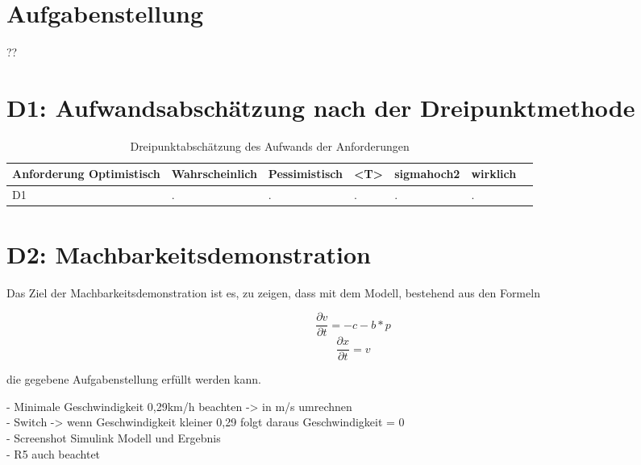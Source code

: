 
\chapter{Aufgabenstellung}\label{cha:Aufgabenstellung}
??
\chapter{D1: Aufwandsabschätzung nach der Dreipunktmethode}\label{cha:D1}
\begin{table}[H]
\centering
\caption{Dreipunktabschätzung des Aufwands der Anforderungen}
\begin{adjustbox}{width=1\textwidth, center=\textwidth}
\renewcommand{\arraystretch}{1}
\begin{tabular}{lllllll}
\textbf{Anforderung} \textbf{Optimistisch} & \textbf{Wahrscheinlich} & \textbf{Pessimistisch} & \textbf{<T>} & \textbf{sigmahoch2} & \textbf{wirklich}\\\hline
D1 & .& .& .& .& .&\\
\end{tabular}

\end{adjustbox}
\label{tbl:ConceptTPTPProductionSymbols}
\end{table}
\chapter{D2: Machbarkeitsdemonstration}\label{cha:D2}
Das Ziel der Machbarkeitsdemonstration ist es, zu zeigen, dass mit dem Modell, bestehend aus den Formeln

\begin{equation}
	\frac{\partial v}{\partial t} = -c-b*p
\end{equation}
\begin{equation}
	\frac{\partial x}{\partial t} = v
\end{equation}

die gegebene Aufgabenstellung erfüllt werden kann.

- Minimale Geschwindigkeit 0,29km/h beachten -> in m/s umrechnen \\
- Switch -> wenn Geschwindigkeit kleiner 0,29 folgt daraus Geschwindigkeit = 0 \\
- Screenshot Simulink Modell und Ergebnis\\
- R5 auch beachtet \\

